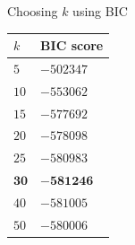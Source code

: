 \documentclass{beamer}
\begin{document}
\begin{frame}{Choosing $k$ using BIC}
  \begin{table}
    \begin{tabular}{ll}
      \hline
      $k$ & BIC score \\
      \hline
      $5$ & $-502347$ \\
      $10$ & $-553062$ \\
      $15$ & $-577692$ \\
      $20$ & $-578098$ \\
      $25$ & $-580983$ \\
      $\bm{30}$ & $\bm{-581246}$ \\
      $40$ & $-581005$ \\
      $50$ & $-580006$ \\
      \hline
    \end{tabular}
  \end{table}
\end{frame}
\end{document}
